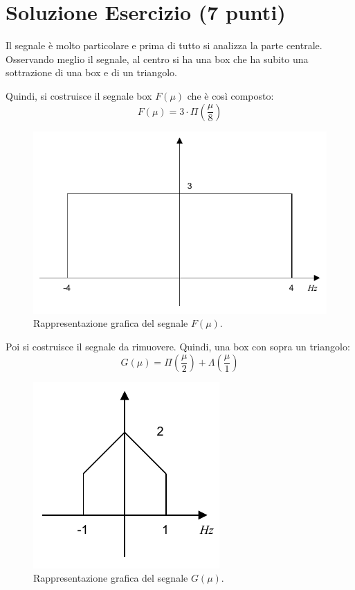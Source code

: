 \documentclass[a4paper]{article}
\begin{document}
	\section{Soluzione Esercizio (7 punti)}
	
	Il segnale è molto particolare e prima di tutto si analizza la parte centrale. Osservando meglio il segnale, al centro si ha una box che ha subito una sottrazione di una box e di un triangolo.\newline
	
	\noindent
	Quindi, si costruisce il segnale box $F\left(\mu\right)$ che è così composto:
	\begin{equation*}
		F\left(\mu\right) = 3 \cdot \Pi\left(\dfrac{\mu}{8}\right)
	\end{equation*}
	\begin{figure}[!hpt]
		\centering
		\includegraphics[width=.8\textwidth]{img/fig_1.pdf}
		\caption*{Rappresentazione grafica del segnale $F\left(\mu\right)$.}
	\end{figure}

	\noindent
	Poi si costruisce il segnale da rimuovere. Quindi, una box con sopra un triangolo:
	\begin{equation*}
		G\left(\mu\right) = \Pi\left(\dfrac{\mu}{2}\right) + \Lambda\left(\dfrac{\mu}{1}\right)
	\end{equation*}
	\begin{figure}[!hpt]
		\centering
		\includegraphics[width=.45\textwidth]{img/fig_2.pdf}
		\caption*{Rappresentazione grafica del segnale $G\left(\mu\right)$.}
	\end{figure}\newpage
\end{document}
